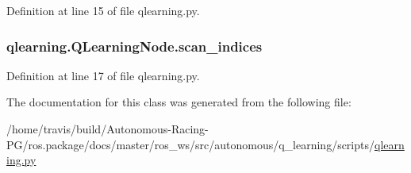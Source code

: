 Definition at line 15 of file qlearning.\+py.

\subsubsection[{\texorpdfstring{scan\+\_\+indices}{scan_indices}}]{\setlength{\rightskip}{0pt plus 5cm}qlearning.\+Q\+Learning\+Node.\+scan\+\_\+indices}\hypertarget{classqlearning_1_1_q_learning_node_a40b085aff23685cc49b297f287743ed6}{}\label{classqlearning_1_1_q_learning_node_a40b085aff23685cc49b297f287743ed6}


Definition at line 17 of file qlearning.\+py.



The documentation for this class was generated from the following file\+:\begin{DoxyCompactItemize}
\item 
/home/travis/build/\+Autonomous-\/\+Racing-\/\+P\+G/ros.\+package/docs/master/ros\+\_\+ws/src/autonomous/q\+\_\+learning/scripts/\hyperlink{qlearning_8py}{qlearning.\+py}\end{DoxyCompactItemize}
